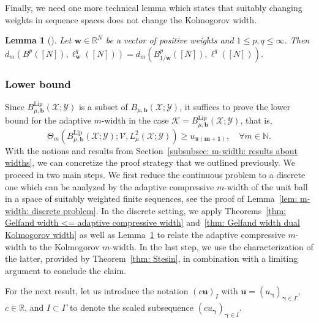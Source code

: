 \documentclass[namedate,webpdf]{ima-authoring-template-blank}
\newcommand*{\Lip}{\mathrm{Lip}}  %
\newcounter{counter}
\numberwithin{counter}{section}
\numberwithin{equation}{section}
\theoremstyle{plain}
\newtheorem{lemma}[counter]{Lemma}
\theoremstyle{definition}
\newcommand*{\cK}{\mathcal{K}}
\newcommand*{\cV}{\mathcal{V}}
\newcommand*{\cX}{\mathcal{X}}
\newcommand*{\cY}{\mathcal{Y}}
\newcommand*{\bbN}{\mathbb{N}}
\newcommand*{\bbR}{\mathbb{R}}
\theoremstyle{thmstyletwo}
\begin{document}
Finally, we need one more technical lemma which states that suitably changing weights in sequence spaces does not change the Kolmogorov width.

\begin{lemma}[{\citet[Lem. B.4]{adcock_OptimalApproximationInfinitedimensionalHolomorphic_2024}}]
\label{lem: Kolmogorov width: equality}
    Let \(\bm{w}\in\bbR^N\) be a vector of positive weights and \( 1 \leq p,q \leq \infty \). Then
    \(
    d_m(B^p([N]), \ell_{\bm{w}}^q([N])) = d_m(B_{1/\bm{w}}^p([N]), \ell^q([N])).
    \)
\end{lemma}



\subsubsection{Lower bound}
\label{subsubsec: m-width: lower bound}

Since \(B_{\mu, \bm{b}}^{\Lip}(\cX; \cY)\) is a subset of \(B_{\mu, \bm{b}}(\cX; \cY)\), it suffices to prove the lower bound for the adaptive \(m\)-width in the case \(\cK = B_{\mu, \bm{b}}^{\Lip}(\cX; \cY)\), that is,
\begin{equation}
\label{eq: m-width: lower bound II}
    \Theta_m(B_{\mu, \bm{b}}^{\Lip}(\cX; \cY); \cV, L_{\mu}^2(\cX; \cY)) \geq u_{\bm{\pi(m+1)}},
    \quad \forall m \in \bbN.
\end{equation}
With the notions and results from Section~\ref{subsubsec: m-width: results about widths}, we can concretize the proof strategy that we outlined previously. We proceed in two main steps. We first reduce the continuous problem to a discrete one which can be analyzed by the adaptive compressive \(m\)-width of the unit ball in a space of suitably weighted finite sequences, see the proof of Lemma~\ref{lem: m-width: discrete problem}. In the discrete setting, we apply Theorems~\ref{thm: Gelfand width <= adaptive compressive width} and~\ref{thm: Gelfand width dual Kolmogorov width} as well as Lemma~\ref{lem: Kolmogorov width: equality} to relate the adaptive compressive \(m\)-width to the Kolmogorov \(m\)-width. In the last step, we use the characterization of the latter, provided by Theorem~\ref{thm: Stesin}, in combination with a limiting argument to conclude the claim.

For the next result, let us introduce the notation \((c \bm{u})_{I}\) with \(\bm{u} = (u_{\bm{\gamma}})_{\bm{\gamma} \in \Gamma}\), \(c \in \bbR\), and \(I \subset \Gamma\) to denote the scaled subsequence \((c u_{\bm{\gamma}})_{\bm{\gamma} \in I}\).
\end{document}
